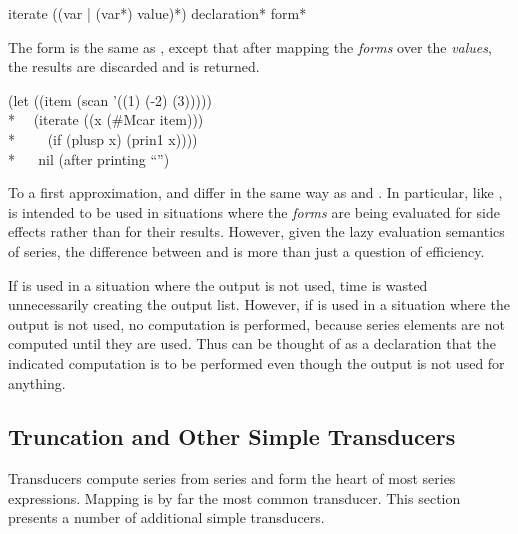 \begin{defmac}
iterate ({({var | ({var}*)} value)}*) {declaration}* {form}*

The form  is the same as , except that after
mapping the \emph{forms} over the \emph{values}, the results are discarded and
 is returned.
\begin{lisp}
(let ((item (scan '((1) (-2) (3))))) \\*
~~(iterate ((x (\#Mcar item))) \\*
~~~~(if (plusp x) (prin1 x)))) \\*
~~{\EV} nil {\rm (after printing ``'')}
\end{lisp}

To a first approximation,  and  differ in the same
way as  and .  In particular, like ,
 is intended to be used in situations where the \emph{forms} are
being evaluated for side effects rather than for their results.  However, given
the lazy evaluation semantics of series, the difference between
 and  is more than just a question of efficiency.

If  is used in a situation where the output is not used, time is
wasted unnecessarily creating the output list.  However, if  is
used in a situation where the output is not used, no computation is
performed, because series elements are not computed until they are used.
Thus  can be thought of as a declaration that the indicated
computation is to be performed even though the output is not used for
anything.
\end{defmac}

\subsection{Truncation and Other Simple Transducers}

Transducers compute series from series and form the heart of most series
expressions.  Mapping is by far the most common transducer.   This section
presents a number of additional simple transducers.


